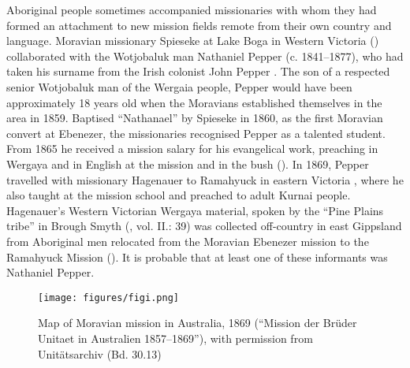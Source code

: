 Aboriginal people sometimes accompanied missionaries with whom they had formed an attachment to new mission fields remote from their own country and language. Moravian missionary Spieseke at Lake Boga in Western Victoria () collaborated with the Wotjobaluk man Nathaniel Pepper (c. 1841--1877), who had taken his surname from the Irish colonist John Pepper \citep{DeAraugo2005}. The son of a respected senior Wotjobaluk man of the Wergaia people, Pepper would have been approximately 18 years old when the Moravians established themselves in the area in 1859. Baptised ``Nathanael'' by Spieseke in 1860, as the first Moravian convert at Ebenezer, the missionaries recognised Pepper as a talented student. From 1865 he received a mission salary for his evangelical work, preaching in Wergaya and in English at the mission and in the bush (\citealt[136--137]{jensz_german_2010}). In 1869, Pepper travelled with missionary Hagenauer to Ramahyuck in eastern Victoria \citep{jensz_german_2010}, where he also taught at the mission school and preached to adult Kurnai people. Hagenauer’s Western Victorian Wergaya material, spoken by the “Pine Plains tribe” in Brough Smyth (\citealt[39]{smyth_1876}, vol. II.: 39) was collected off-country in east Gippsland from Aboriginal men relocated from the Moravian Ebenezer mission to the Ramahyuck Mission (). It is probable that at least one of these informants was Nathaniel Pepper. 

\begin{figure}[t]
\texttt{[image: figures/figi.png]}
\caption{Map of Moravian mission in Australia, 1869 (“Mission der Brüder Unitaet in Australien 1857--1869”), with permission from Unitäts\-archiv (Bd. 30.13)}
\label{fig:key:1.1.3-9}
\end{figure}

